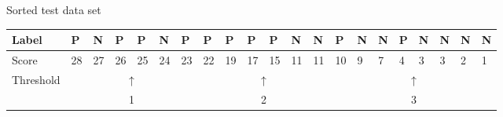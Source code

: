 \noindent
Sorted test data set
\begin{table}[H]
\centering
\scriptsize
\begin{tabular}{lllllllllllllllllllll}
\hline
\multicolumn{1}{|l|}{Label} & \multicolumn{1}{l|}{P}  & \multicolumn{1}{l|}{N}  & \multicolumn{1}{l|}{P}  & \multicolumn{1}{l|}{P}  & \multicolumn{1}{l|}{N}  & \multicolumn{1}{l|}{P}  & \multicolumn{1}{l|}{P}  & \multicolumn{1}{l|}{P}  & \multicolumn{1}{l|}{P}  & \multicolumn{1}{l|}{P}  & \multicolumn{1}{l|}{N}  & \multicolumn{1}{l|}{N}  & \multicolumn{1}{l|}{P}  & \multicolumn{1}{l|}{N} & \multicolumn{1}{l|}{N} & \multicolumn{1}{l|}{P} & \multicolumn{1}{l|}{N} & \multicolumn{1}{l|}{N} & \multicolumn{1}{l|}{N} & \multicolumn{1}{l|}{N} \\ \hline
\multicolumn{1}{|l|}{Score} & \multicolumn{1}{l|}{28} & \multicolumn{1}{l|}{27} & \multicolumn{1}{l|}{26} & \multicolumn{1}{l|}{25} & \multicolumn{1}{l|}{24} & \multicolumn{1}{l|}{23} & \multicolumn{1}{l|}{22} & \multicolumn{1}{l|}{19} & \multicolumn{1}{l|}{17} & \multicolumn{1}{l|}{15} & \multicolumn{1}{l|}{11} & \multicolumn{1}{l|}{11} & \multicolumn{1}{l|}{10} & \multicolumn{1}{l|}{9} & \multicolumn{1}{l|}{7} & \multicolumn{1}{l|}{4} & \multicolumn{1}{l|}{3} & \multicolumn{1}{l|}{3} & \multicolumn{1}{l|}{2} & \multicolumn{1}{l|}{1} \\ \hline
\multirow{2}{*}{Threshold}  &                         &                         & \multicolumn{2}{c}{$\uparrow$}                             &                         &                         &                         &                         & \multicolumn{2}{c}{$\uparrow$}                             &                         &                         &                         &                        &                        & \multicolumn{2}{c}{$\uparrow$}                           &                        &                        &                        \\
                            &                         &                         & \multicolumn{2}{c}{1}                             &                         &                         &                         &                         & \multicolumn{2}{c}{2}                             &                         &                         &                         &                        &                        & \multicolumn{2}{c}{3}                           &                        &                        &                       
\end{tabular}
\end{table}

